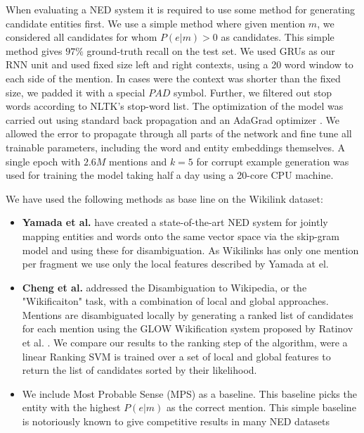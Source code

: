 \documentclass[11pt]{article}
\begin{document}
When evaluating a NED system it is required to use some method for generating candidate entities first. We use a simple method where given mention $m$, we considered all candidates for whom $P(e|m)>0$ as candidates. This simple method gives $97\%$ ground-truth recall on the test set. 
We used GRUs as our RNN unit and used fixed size left and right contexts, using a 20 word window to each side of the mention. In cases were the context was shorter than the fixed size, we padded it with a special $PAD$ symbol. Further, we filtered out stop words according to NLTK's stop-word list.
The optimization of the model was carried out using standard back propagation and an AdaGrad optimizer \cite{duchi2011adaptive}. We allowed the error to propagate through all parts of the network and fine tune all trainable parameters, including the word and entity embeddings themselves. A single epoch with $2.6M$ mentions and $k=5$ for corrupt example generation was used for training the model taking half a day using a 20-core CPU machine.

We have used the following methods as base line on the Wikilink dataset:

\begin{itemize} 
	\item  \textbf{Yamada et al.}  have created a state-of-the-art NED system for jointly mapping entities and words onto the same vector space via the skip-gram model and using these for disambiguation. As Wikilinks has only one mention per fragment we use only the local features described by Yamada at el.
	
	\item \textbf{Cheng et al.}  addressed the Disambiguation to Wikipedia, or the "Wikificaiton" task, with a combination of local and global approaches. Mentions are disambiguated locally by generating a ranked list of candidates for each mention using the GLOW Wikification system proposed by Ratinov et al. . We compare our results to the ranking step of the algorithm, were a linear Ranking SVM is trained over a set of local and global features to return the list of candidates sorted by their likelihood.
	
	\item We include Most Probable Sense (MPS) as a baseline. This baseline picks the entity with the highest $P(e|m)$ as the correct mention. This simple baseline is notoriously known to give competitive results in many NED datasets 
\end{itemize}
\end{document}
